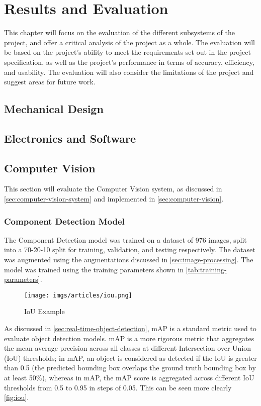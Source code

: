 \section{Results and Evaluation}
\label{sec:evaluation}
This chapter will focus on the evaluation of the different subsystems of the project, and offer a critical analysis of the project as a whole. The evaluation will be based on the project's ability to meet the requirements set out in the project specification, as well as the project's performance in terms of accuracy, efficiency, and usability. The evaluation will also consider the limitations of the project and suggest areas for future work.

\subsection{Mechanical Design}

\subsection{Electronics and Software}

\subsection{Computer Vision}
\label{sec:computer-vision-evaluation}
This section will evaluate the Computer Vision system, as discussed in \autoref{sec:computer-vision-system} and implemented in \autoref{sec:computer-vision}.

\subsubsection{Component Detection Model}
The Component Detection model was trained on a dataset of 976 images, split into a 70-20-10 split for training, validation, and testing respectively. The dataset was augmented using the augmentations discussed in \autoref{sec:image-processing}. The model was trained using the training parameters shown in \autoref{tab:training-parameters}.

\begin{figure}[H]
    \centering
    \texttt{[image: imgs/articles/iou.png]}
    \caption{IoU Example \cite{rosebrock_2016}}
    \label{fig:iou}
  \end{figure}
  
As discussed in \autoref{sec:real-time-object-detection}, mAP is a standard metric used to evaluate object detection models. mAP is a more rigorous metric that aggregates the mean average precision across all classes at different Intersection over Union (IoU) thresholds; in mAP, an object is considered as detected if the IoU is greater than 0.5 (the predicted bounding box overlaps the ground truth bounding box by at least 50\%), whereas in mAP, the mAP score is aggregated across different IoU thresholds from 0.5 to 0.95 in steps of 0.05. This can be seen more clearly \autoref{fig:iou}.
  
